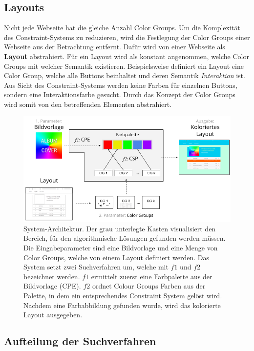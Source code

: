 \documentclass[11pt,a4paper,bibliography=totoc,twocolumn]{scrartcl}
\begin{document}
\subsection{Layouts}

Nicht jede Webseite hat die gleiche Anzahl Color Groups. Um die Komplexität des Constraint-Systems zu reduzieren, wird die Festlegung der Color Groups einer Webseite aus der Betrachtung entfernt. Dafür wird von einer Webseite als \textbf{Layout} abstrahiert. Für ein Layout wird als konstant angenommen, welche Color Groups mit welcher Semantik existieren. Beispielsweise definiert ein Layout eine Color Group, welche alle Buttons beinhaltet und deren Semantik \emph{Interaktion} ist. Aus Sicht des Constraint-Systems werden keine Farben für einzelnen Buttons, sondern eine Interaktionsfarbe gesucht. Durch das Konzept der Color Groups wird somit von den betreffenden Elementen abstrahiert.

\begin{figure}
	\centering
	\includegraphics[width=1\textwidth]{img/architecture.png}
	\caption{System-Architektur. Der grau unterlegte Kasten visualisiert den Bereich, für den algorithmische Lösungen gefunden werden müssen. Die Eingabeparameter sind eine Bildvorlage und eine Menge von Color Groups, welche von einem Layout definiert werden. Das System setzt zwei Suchverfahren um, welche mit $f1$ und $f2$ bezeichnet werden. $f1$ ermittelt zuerst eine Farbpalette aus der Bildvorlage (CPE). $f2$ ordnet Colour Groups Farben aus der Palette, in dem ein entsprechendes Constraint System gelöst wird. Nachdem eine Farbabbildung gefunden wurde, wird das kolorierte Layout ausgegeben. }
	\label{fig:architecture}
\end{figure}

\subsection{Aufteilung der Suchverfahren}
\end{document}
